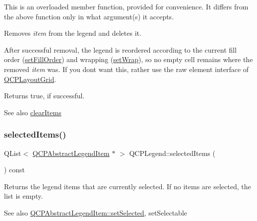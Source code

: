 This is an overloaded member function, provided for convenience. It differs from the above function only in what argument(s) it accepts.

Removes {\itshape item} from the legend and deletes it.

After successful removal, the legend is reordered according to the current fill order (\mbox{\hyperlink{class_q_c_p_layout_grid_affc2f3cfd22f28698c5b29b960d2a391}{set\+Fill\+Order}}) and wrapping (\mbox{\hyperlink{class_q_c_p_layout_grid_ab36af18d77e4428386d02970382ee598}{set\+Wrap}}), so no empty cell remains where the removed {\itshape item} was. If you don\textquotesingle{}t want this, rather use the raw element interface of \mbox{\hyperlink{class_q_c_p_layout_grid}{Q\+C\+P\+Layout\+Grid}}.

Returns true, if successful.

\begin{DoxySeeAlso}{See also}
\mbox{\hyperlink{class_q_c_p_legend_a24795c7250eb5214fcea16b7217b4dfb}{clear\+Items}} 
\end{DoxySeeAlso}
\mbox{\label{class_q_c_p_legend_ac7d9e567d5c551e09cd9bcc4306c5532}} 
\subsubsection{\texorpdfstring{selected\+Items()}{selectedItems()}}
{\footnotesize\ttfamily Q\+List$<$ \mbox{\hyperlink{class_q_c_p_abstract_legend_item}{Q\+C\+P\+Abstract\+Legend\+Item}} $\ast$ $>$ Q\+C\+P\+Legend\+::selected\+Items (\begin{DoxyParamCaption}{ }\end{DoxyParamCaption}) const}

Returns the legend items that are currently selected. If no items are selected, the list is empty.

\begin{DoxySeeAlso}{See also}
\mbox{\hyperlink{class_q_c_p_abstract_legend_item_a6eed93b0ab99cb3eabb043fb08179c2b}{Q\+C\+P\+Abstract\+Legend\+Item\+::set\+Selected}}, set\+Selectable 
\end{DoxySeeAlso}
\mbox{\label{class_q_c_p_legend_a82c88464edac07a9eefaf3906268df3b}} 
